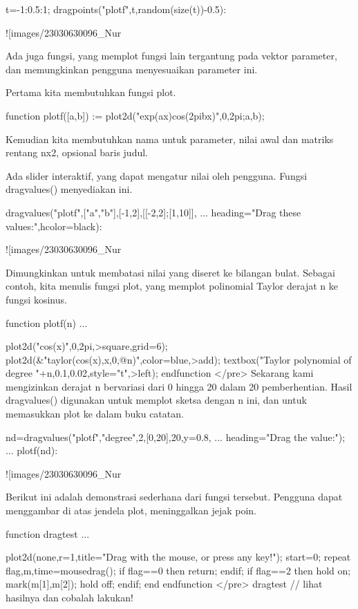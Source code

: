 \documentclass{article}
\begin{document}
\>t=-1:0.5:1; dragpoints("plotf",t,random(size(t))-0.5):


![images/23030630096_Nur%

Ada juga fungsi, yang memplot fungsi lain tergantung pada vektor
parameter, dan memungkinkan pengguna menyesuaikan parameter ini.


Pertama kita membutuhkan fungsi plot.


\>function plotf([a,b]) := plot2d("exp(a\*x)\*cos(2pi\*b\*x)",0,2pi;a,b);


Kemudian kita membutuhkan nama untuk parameter, nilai awal dan matriks
rentang nx2, opsional baris judul.


Ada slider interaktif, yang dapat mengatur nilai oleh pengguna. Fungsi
dragvalues() menyediakan ini.


\>dragvalues("plotf",["a","b"],[-1,2],[[-2,2];[1,10]], ...  
\>     heading="Drag these values:",hcolor=black):


![images/23030630096_Nur%

Dimungkinkan untuk membatasi nilai yang diseret ke bilangan bulat.
Sebagai contoh, kita menulis fungsi plot, yang memplot polinomial
Taylor derajat n ke fungsi kosinus.


\>function plotf(n) ...


    plot2d("cos(x)",0,2pi,>square,grid=6);
    plot2d(&"taylor(cos(x),x,0,@n)",color=blue,>add);
    textbox("Taylor polynomial of degree "+n,0.1,0.02,style="t",>left);
    endfunction
</pre>
Sekarang kami mengizinkan derajat n bervariasi dari 0 hingga 20 dalam
20 pemberhentian. Hasil dragvalues() digunakan untuk memplot sketsa
dengan n ini, dan untuk memasukkan plot ke dalam buku catatan.


\>nd=dragvalues("plotf","degree",2,[0,20],20,y=0.8, ...  
\>      heading="Drag the value:"); ...  
\>   plotf(nd):


![images/23030630096_Nur%

Berikut ini adalah demonstrasi sederhana dari fungsi tersebut.
Pengguna dapat menggambar di atas jendela plot, meninggalkan jejak
poin.


\>function dragtest ...


      plot2d(none,r=1,title="Drag with the mouse, or press any key!");
      start=0;
      repeat
        {flag,m,time}=mousedrag();
        if flag==0 then return; endif;
        if flag==2 then
          hold on; mark(m[1],m[2]); hold off;
        endif;
      end
    endfunction
</pre>
\>dragtest // lihat hasilnya dan cobalah lakukan!
\end{document}
